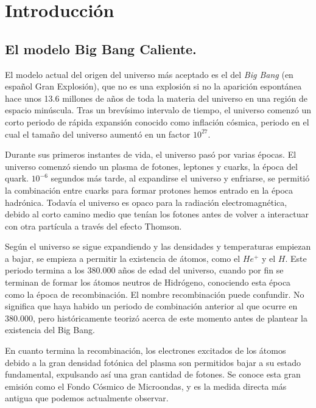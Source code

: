 \chapter{Introducción}

\section{El modelo Big Bang Caliente. }

El modelo actual del origen del universo más aceptado es el del \textit{Big Bang} (en español Gran Explosión), que no es una explosión si no la aparición espontánea hace unos 13.6 millones de años de toda la materia del universo en una región de espacio minúscula. Tras un brevísimo intervalo de tiempo, el universo comenzó un corto periodo de rápida expansión conocido como inflación cósmica, periodo en el cual el tamaño del universo aumentó en un factor $10^{27}$.

Durante sus primeros instantes de vida, el universo pasó por varias épocas. El universo comenzó siendo un plasma de fotones, leptones y cuarks, la época del quark. $10^{-6}$ segundos más tarde, al expandirse el universo y enfriarse, se permitió la combinación entre cuarks para formar protones hemos entrado en la época hadrónica. Todavía el universo es opaco para la radiación electromagnética, debido al corto camino medio que tenían los fotones antes de volver a interactuar con otra partícula a través del efecto Thomson. 

Según el universo se sigue expandiendo y las densidades y temperaturas empiezan a bajar, se empieza a permitir la existencia de átomos, como el $He^{+}$ y el $H$. Este periodo termina a los 380.000 años de edad del universo, cuando por fin se terminan de formar los átomos neutros de Hidrógeno, conociendo esta época como la época de recombinación. El nombre recombinación puede confundir. No significa que haya habido un periodo de combinación anterior al que ocurre en 380.000, pero históricamente teorizó acerca de este momento antes de plantear la existencia del Big Bang. 

En cuanto termina la recombinación, los electrones excitados de los átomos debido a la gran densidad fotónica del plasma son permitidos bajar a su estado fundamental, expulsando así una gran cantidad de fotones. Se conoce esta gran emisión como el Fondo Cósmico de Microondas, y es la medida directa más antigua que podemos actualmente observar.

